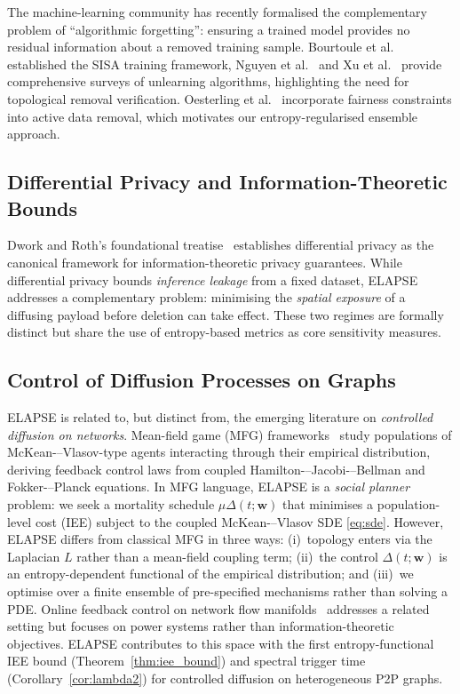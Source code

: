 \documentclass[review,12pt]{elsarticle}
\newcommand{\bfw}{\mathbf{w}}
\begin{document}
The machine-learning community has recently formalised the complementary
problem of ``algorithmic forgetting'': ensuring a trained model provides no
residual information about a removed training sample. Bourtoule
et al.~\cite{bourtoule2021machine} established the SISA training framework,
Nguyen et al.~\cite{nguyen2025survey} and Xu et al.~\cite{xu2023machine}
provide comprehensive surveys of unlearning algorithms, highlighting the
need for topological removal verification. Oesterling
et al.~\cite{oesterling2024fair} incorporate fairness constraints into active
data removal, which motivates our entropy-regularised ensemble approach.

\subsection{Differential Privacy and Information-Theoretic Bounds}

Dwork and Roth's foundational treatise~\cite{dwork2014algorithmic} establishes
differential privacy as the canonical framework for information-theoretic
privacy guarantees. While differential privacy bounds \emph{inference
leakage} from a fixed dataset, ELAPSE addresses a complementary problem:
minimising the \emph{spatial exposure} of a diffusing payload before deletion
can take effect. These two regimes are formally distinct but share the use of
entropy-based metrics as core sensitivity measures.

\subsection{Control of Diffusion Processes on Graphs}

ELAPSE is related to, but distinct from, the emerging literature on
\emph{controlled diffusion on networks}.
Mean-field game (MFG) frameworks~\cite{carmona2018probabilistic,achdou2020mean}
study populations of McKean-–Vlasov-type agents interacting through their
empirical distribution, deriving feedback control laws from coupled
Hamilton-–Jacobi-–Bellman and Fokker-–Planck equations.
In MFG language, ELAPSE is a \emph{social planner} problem: we seek a
mortality schedule $\mu\Delta(t;\bfw)$ that minimises a population-level cost
(IEE) subject to the coupled McKean-–Vlasov SDE \eqref{eq:sde}.
However, ELAPSE differs from classical MFG in three ways: (i)~topology enters
via the Laplacian $L$ rather than a mean-field coupling term; (ii)~the control
$\Delta(t;\bfw)$ is an entropy-dependent functional of the empirical
distribution; and (iii)~we optimise over a finite ensemble of pre-specified
mechanisms rather than solving a PDE.
Online feedback control on network flow
manifolds~\cite{bianchin2021online} addresses a related setting but focuses on
power systems rather than information-theoretic objectives.
ELAPSE contributes to this space with the first entropy-functional IEE bound
(Theorem~\ref{thm:iee_bound}) and spectral trigger time
(Corollary~\ref{cor:lambda2}) for controlled diffusion on heterogeneous P2P graphs.
\end{document}
